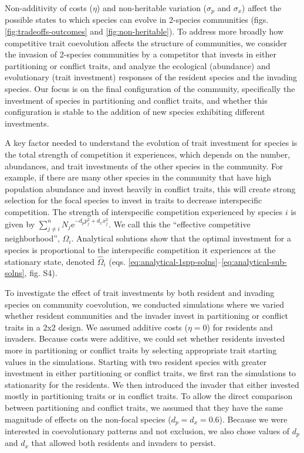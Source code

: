 Non-additivity of costs ($\eta$) and non-heritable variation
($\sigma_{p}$ and $\sigma_{x}$) affect the possible states to which
species can evolve in 2-species communities (figs. \ref{fig:tradeoffs-outcomes}
and \ref{fig:non-heritable}). To address
more broadly how competitive trait coevolution affects the structure of
communities, we consider the invasion of 2-species communities by a
competitor that invests in either partitioning or conflict traits, and
analyze the ecological (abundance) and evolutionary (trait investment)
responses of the resident species and the invading species. Our focus is
on the final configuration of the community, specifically the investment
of species in partitioning and conflict traits, and whether this
configuration is stable to the addition of new species exhibiting
different investments.

A key factor needed to understand the evolution of trait investment for
species is the total strength of competition it experiences, which
depends on the number, abundances, and trait investments of the other
species in the community. For example, if there are many other species
in the community that have high population abundance and invest heavily
in conflict traits, this will create strong selection for the focal
species to invest in traits to decrease interspecific competition. The
strength of interspecific competition experienced by species $i$ is
given by
$\sum_{j \neq i}^{n}{N_{j}\text{e}^{- d_{p}p_{j}^{2} + d_{x}x_{j}^{2}}}$.
We call this the ``effective competitive neighborhood'', $\Omega_{i}$.
Analytical solutions show that the optimal investment for a species is
proportional to the interspecific competition it experiences at the
stationary state, denoted ${\hat{\Omega}}_{i}$
(eqs. \ref{eq:analytical-1spp-solns}--\ref{eq:analytical-sub-solns},
fig. S4).

To investigate the effect of trait investments by both resident and
invading species on community coevolution, we conducted simulations
where we varied whether resident communities and the invader invest in
partitioning or conflict traits in a 2x2 design. We assumed additive
costs ($\eta = 0$) for residents and invaders. Because costs were
additive, we could set whether residents invested more in partitioning
or conflict traits by selecting appropriate trait starting values in the
simulations. Starting with two resident species with greater investment 
in either partitioning or conflict traits, we first ran the simulations 
to stationarity for the residents. We then introduced the invader
that either invested mostly in partitioning traits or in conflict
traits. To allow the direct comparison between partitioning and conflict
traits, we assumed that they have the same magnitude of effects on the
non-focal species ($d_{p} = d_{x} = 0.6$). 
Because we were interested in coevolutionary patterns and not exclusion, we 
also chose values of $d_p$ and $d_x$ that allowed both residents and invaders 
to persist.

